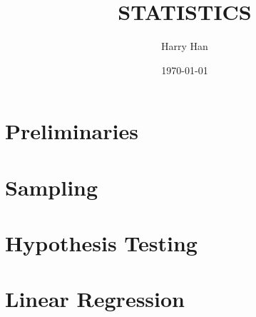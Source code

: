 \documentclass[12pt, a4paper]{report}
\title{
	STATISTICS\\
	\large{}
}
\author{Harry Han}
\date{\today}
\begin{document}
\maketitle
\tableofcontents

\chapter{Preliminaries}


\chapter{Sampling}


\chapter{Hypothesis Testing}


\chapter{Linear Regression}

\end{document}
